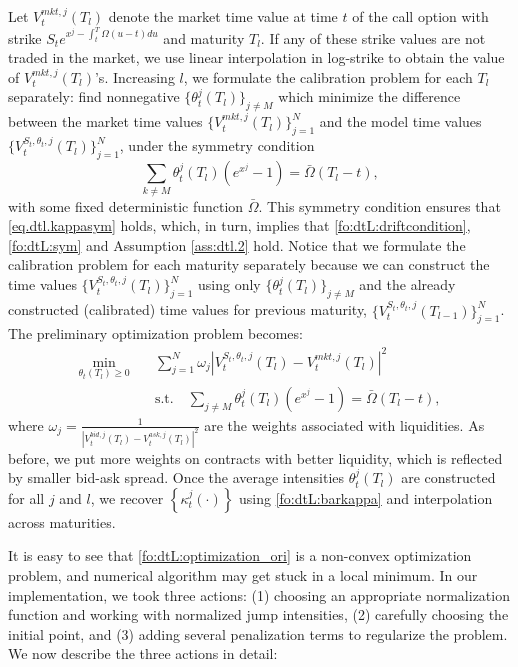 \documentclass{article}
\numberwithin{equation}{section}
\def\bOmega{\bar{\Omega}}
\begin{document}
Let $V_t^{mkt,j}(T_l)$ denote the market time value at time $t$ of the call option with strike $S_t e^{x^j - \int_t^T \Omega(u-t) du}$ and maturity $T_l$. If any of these strike values are not traded in the market, we use linear interpolation in log-strike to obtain the value of $V_t^{mkt,j}(T_l)$'s. Increasing $l$, we formulate the calibration problem for each $T_l$ separately: find nonnegative $\{\theta_t^j(T_l)\}_{j\neq M}$ which minimize the difference between the market time values $\{V_t^{mkt,j}(T_l)\}_{j=1}^N$ and the model time values $\{V^{S_t,\theta_t,j}_t(T_l)\}_{j=1}^N$, under the symmetry condition
\begin{equation}\label{eq.bOmega.theta}
\sum_{k\neq M} \theta^j_t(T_l) \left(e^{x^j}-1\right) = \bOmega(T_l-t),
\end{equation}
with some fixed deterministic function $\bOmega$. This symmetry condition ensures that \eqref{eq.dtl.kappasym} holds, which, in turn, implies that \eqref{fo:dtL:driftcondition}, \eqref{fo:dtL:sym} and Assumption \ref{ass:dtl.2} hold.
Notice that we formulate the calibration problem for each maturity separately because we can construct the time values $\{V^{S_t,\theta_t,j}_t(T_l)\}_{j=1}^N$ using only $\{\theta_t^j(T_l)\}_{j\neq M}$ and the already constructed (calibrated) time values for previous maturity, $\{V^{S_t,\theta_t,j}_t(T_{l-1})\}_{j=1}^N$.
The preliminary optimization problem becomes:
\begin{align}\label{fo:dtL:optimization_ori}
\min_{\theta_t(T_l) \ge 0} \quad & \sum_{j=1}^N \omega_j |V_t^{S_t,\theta_t,j}(T_l) - V_t^{mkt,j}(T_l)|^2\\
& \text{s.t.} \quad \sum_{j\neq M} \theta_t^j(T_l) (e^{x^j} - 1) = \bOmega(T_l - t), \nonumber
\end{align}
where $\omega_j = \frac{1}{|V_t^{bid,j}(T_l) - V_t^{ask,j}(T_l)|^2}$ are the weights associated with liquidities. As before, we put more weights on contracts with better liquidity, which is reflected by smaller bid-ask spread. Once the average intensities $\theta_t^j(T_l)$ are constructed for all $j$ and $l$, we recover $\left\{\kappa^j_t(\cdot)\right\}$ using \eqref{fo:dtL:barkappa} and interpolation across maturities.



It is easy to see that \eqref{fo:dtL:optimization_ori} is a non-convex optimization problem, and numerical algorithm may get stuck in a local minimum. In our implementation, we took three actions: (1) choosing an appropriate normalization function and working with normalized jump intensities, (2) carefully choosing the initial point, and (3) adding several penalization terms to regularize the problem. We now describe the three actions in detail:
\end{document}
